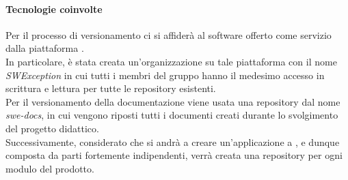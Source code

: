 \paragraph{Tecnologie coinvolte}
Per il processo di versionamento ci si affiderà al software  offerto come servizio dalla piattaforma .\\
In particolare, è stata creata un'organizzazione su tale piattaforma con il nome \textit{SWException} in cui tutti i membri del gruppo
hanno il medesimo accesso in scrittura e lettura per tutte le repository esistenti.\\
Per il versionamento della documentazione viene usata una repository dal nome \textit{swe-docs}, in cui vengono riposti tutti i
documenti creati durante lo svolgimento del progetto didattico.\\
Successivamente,  considerato che si andrà a creare un'applicazione a , e dunque composta da parti fortemente indipendenti,
verrà creata una repository per ogni modulo del prodotto.

